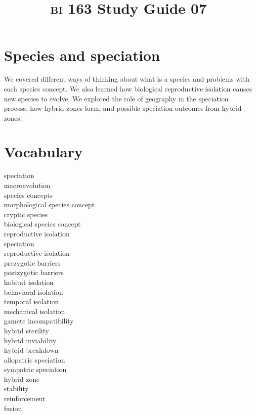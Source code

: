 \documentclass[letterpaper]{tufte-handout}
\title{{\scshape bi} 163 Study Guide 07}
\date{} %
\begin{document}
\maketitle	%

\section*{Species and speciation}

We covered different ways of thinking about what is a species and problems with each species concept. We also learned how biological reproductive isolation causes new species to evolve. We explored the role of geography in the speciation process, how hybrid zones form, and possible speciation outcomes from hybrid zones.

\section*{Vocabulary}

\vspace{-1\baselineskip}
\begin{multicols}{2}
speciation \\
macroevolution \\
species concepts\\
morphological species concept\\
cryptic species\\
biological species concept\\
reproductive isolation \\
speciation \\
reproductive isolation \\
prezygotic barriers \\
postzygotic barriers \\
habitat isolation \\
behavioral isolation \\
temporal isolation \\
mechanical isolation \\
gamete incompatibility \\
hybrid sterility \\
hybrid inviability \\
hybrid breakdown \\
allopatric speciation \\
sympatric speciation \\
hybrid zone \\
stability \\
reinforcement \\
fusion %
\end{multicols}
\end{document}
